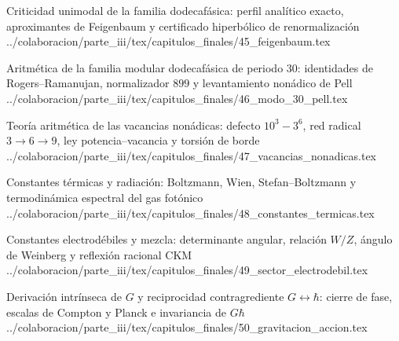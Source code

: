 \begin{HMTScientificOwnerSubordinated}

\end{HMTScientificOwnerSubordinated}

\HMTFlushCurrentChapter
\HMTSuccessorChapterInput
  {Criticidad unimodal de la familia dodecafásica: perfil analítico exacto, aproximantes de Feigenbaum y certificado hiperbólico de renormalización}
  {../colaboracion/parte_iii/tex/capitulos_finales/45_feigenbaum.tex}

\HMTFlushCurrentChapter
\HMTSuccessorChapterInput
  {Aritmética de la familia modular dodecafásica de periodo \(30\): identidades de Rogers--Ramanujan, normalizador \(899\) y levantamiento nonádico de Pell}
  {../colaboracion/parte_iii/tex/capitulos_finales/46_modo_30_pell.tex}
\begin{HMTSpiralChapterBody}

\end{HMTSpiralChapterBody}

\HMTFlushCurrentChapter
\HMTSuccessorChapterInput
  {Teoría aritmética de las vacancias nonádicas: defecto \texorpdfstring{\(10^3-3^6\)}{10^3-3^6}, red radical \(3\to6\to9\), ley potencia--vacancia y torsión de borde}
  {../colaboracion/parte_iii/tex/capitulos_finales/47_vacancias_nonadicas.tex}

\HMTFlushCurrentChapter
\HMTSuccessorChapterInput
  {Constantes térmicas y radiación: Boltzmann, Wien, Stefan--Boltzmann y termodinámica espectral del gas fotónico}
  {../colaboracion/parte_iii/tex/capitulos_finales/48_constantes_termicas.tex}

\HMTFlushCurrentChapter
\HMTSuccessorChapterInput
  {Constantes electrodébiles y mezcla: determinante angular, relación \(W/Z\), ángulo de Weinberg y reflexión racional CKM}
  {../colaboracion/parte_iii/tex/capitulos_finales/49_sector_electrodebil.tex}

\HMTFlushCurrentChapter
\HMTSuccessorChapterInput
  {Derivación intrínseca de \(G\) y reciprocidad contragrediente \texorpdfstring{\(G\leftrightarrow\hbar\)}{G<->hbar}: cierre de fase, escalas de Compton y Planck e invariancia de \(G\hbar\)}
  {../colaboracion/parte_iii/tex/capitulos_finales/50_gravitacion_accion.tex}


